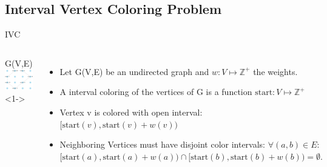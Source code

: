 \subsection*{Interval Vertex Coloring Problem}
\begin{frame}{IVC}
  \begin{columns}
        \centering
        G(V,E) \\
        \null
        \includegraphics[width=1\textwidth]{figures/ICV0.pdf}<1-> \\

    \begin{itemize}
      \item<1-> Let G(V,E) be an undirected graph and $w : V \mapsto \mathbb{Z^+}$ the weights.
      \null
      \vfill
      \null
      \item<2-> A interval coloring of the vertices of G is a function $\text{start} : V \mapsto \mathbb{Z^+}$
      \null
      \vfill
      \null
      \item<3-> Vertex v is colored with open interval:
      $[\text{start}(v), \text{start}(v)+w(v))$
      \null
      \vfill
      \null
      \item<4-> Neighboring Vertices must have disjoint color intervals: 
      $\forall (a, b) \in E:$ \\
      $ [\text{start}(a), \text{start}(a) + w(a)) \cap [\text{start}(b), \text{start}(b) + w(b)) = \emptyset.$
      
    \end{itemize}
  \end{columns}
\end{frame}

